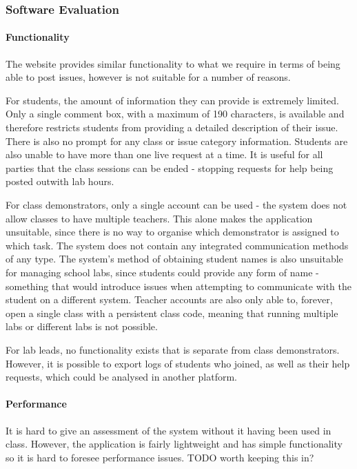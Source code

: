 \documentclass[a4paper,11pt]{article}
\begin{document}
\subsubsection{Software Evaluation}

\paragraph{Functionality}
The website provides similar functionality to what we require in terms of being able to post issues, however is not suitable for a number of reasons.

For students, the amount of information they can provide is extremely limited. Only a single comment box, with a maximum of 190 characters, is available and therefore restricts students from providing a detailed description of their issue. There is also no prompt for any class or issue category information. Students are also unable to have more than one live request at a time. It is useful for all parties that the class sessions can be ended - stopping requests for help being posted outwith lab hours.

For class demonstrators, only a single account can be used - the system does not allow classes to have multiple teachers. This alone makes the application unsuitable, since there is no way to organise which demonstrator is assigned to which task. The system does not contain any integrated communication methods of any type. The system's method of obtaining student names is also unsuitable for managing school labs, since students could provide any form of name - something that would introduce issues when attempting to communicate with the student on a different system. Teacher accounts are also only able to, forever, open a single class with a persistent class code, meaning that running multiple labs or different labs is not possible.

For lab leads, no functionality exists that is separate from class demonstrators. However, it is possible to export logs of students who joined, as well as their help requests, which could be analysed in another platform.


\paragraph{Performance}  
It is hard to give an assessment of the system without it having been used in class. However, the application is fairly lightweight and has simple functionality so it is hard to foresee performance issues. TODO worth keeping this in?
\end{document}
